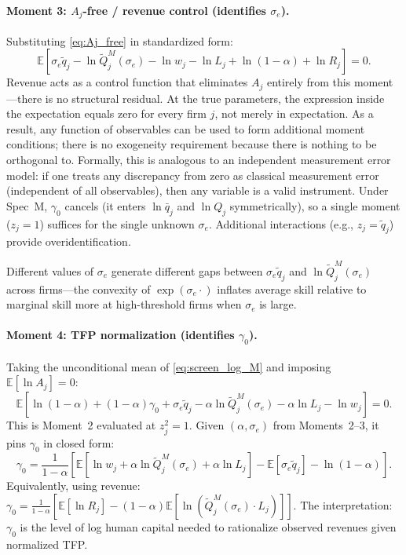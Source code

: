 \documentclass[11pt]{article}
\begin{document}
\paragraph{Moment 3: $A_j$-free / revenue control (identifies $\sigma_e$).} Substituting \eqref{eq:Aj_free} in standardized form:
\begin{equation}\label{eq:m3_M}
\mathbb{E}\!\left[\sigma_e\tilde q_j - \ln\tilde Q_j^M(\sigma_e) - \ln w_j - \ln L_j + \ln(1-\alpha) + \ln R_j\right] = 0.
\end{equation}
Revenue acts as a control function that eliminates $A_j$ entirely from this moment---there is no structural residual. At the true parameters, the expression inside the expectation equals zero for every firm $j$, not merely in expectation. As a result, any function of observables can be used to form additional moment conditions; there is no exogeneity requirement because there is nothing to be orthogonal to. Formally, this is analogous to an independent measurement error model: if one treats any discrepancy from zero as classical measurement error (independent of all observables), then any variable is a valid instrument. Under Spec~M, $\gamma_0$ cancels (it enters $\ln\bar q_j$ and $\ln Q_j$ symmetrically), so a single moment ($z_j = 1$) suffices for the single unknown $\sigma_e$. Additional interactions (e.g., $z_j = \tilde q_j$) provide overidentification.

Different values of $\sigma_e$ generate different gaps between $\sigma_e\tilde q_j$ and $\ln\tilde Q_j^M(\sigma_e)$ across firms---the convexity of $\exp(\sigma_e\cdot)$ inflates average skill relative to marginal skill more at high-threshold firms when $\sigma_e$ is large.

\paragraph{Moment 4: TFP normalization (identifies $\gamma_0$).} Taking the unconditional mean of \eqref{eq:screen_log_M} and imposing $\mathbb{E}[\ln A_j]=0$:
\begin{equation}\label{eq:m4_M}
\mathbb{E}\!\left[\ln(1-\alpha) + (1-\alpha)\gamma_0 + \sigma_e\tilde q_j - \alpha\ln\tilde Q_j^M(\sigma_e) - \alpha\ln L_j - \ln w_j\right] = 0.
\end{equation}
This is Moment~2 evaluated at $z_j^2 = 1$. Given $(\alpha, \sigma_e)$ from Moments~2--3, it pins $\gamma_0$ in closed form:
\begin{equation}\label{eq:gamma0_M}
\gamma_0 = \frac{1}{1-\alpha}\left[\mathbb{E}\!\left[\ln w_j + \alpha\ln\tilde Q_j^M(\sigma_e) + \alpha\ln L_j\right] - \mathbb{E}[\sigma_e\tilde q_j] - \ln(1-\alpha)\right].
\end{equation}
Equivalently, using revenue: $\gamma_0 = \frac{1}{1-\alpha}\left[\mathbb{E}[\ln R_j] - (1-\alpha)\mathbb{E}[\ln(\tilde Q_j^M(\sigma_e)\cdot L_j)]\right].$
The interpretation: $\gamma_0$ is the level of log human capital needed to rationalize observed revenues given normalized TFP.
\end{document}
